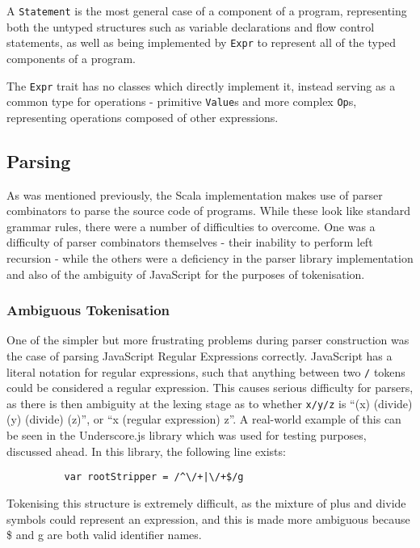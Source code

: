 \documentclass[british, twoside]{bhamthesis}
\theoremstyle{definition}
\begin{document}
      A \texttt{Statement} is the most general case of a component of a program, representing both the untyped structures such as variable declarations and flow control statements, as well as being implemented by \texttt{Expr} to represent all of the typed components of a program.

      The \texttt{Expr} trait has no classes which directly implement it, instead serving as a common type for operations - primitive \texttt{Value}s and more complex \texttt{Op}s, representing operations composed of other expressions.

    \subsection{Parsing}
      As was mentioned previously, the Scala implementation makes use of parser combinators to parse the source code of programs. While these look like standard grammar rules, there were a number of difficulties to overcome. One was a difficulty of parser combinators themselves - their inability to perform left recursion - while the others were a deficiency in the parser library implementation and also of the ambiguity of JavaScript for the purposes of tokenisation.

      \subsubsection{Ambiguous Tokenisation}
        One of the simpler but more frustrating problems during parser construction was the case of parsing JavaScript Regular Expressions correctly. JavaScript has a literal notation for regular expressions, such that anything between two \texttt{/} tokens could be considered a regular expression. This causes serious difficulty for parsers, as there is then ambiguity at the lexing stage as to whether \texttt{x/y/z} is ``(x) (divide) (y) (divide) (z)'', or ``x (regular expression) z''. A real-world example of this can be seen in the Underscore.js library which was used for testing purposes, discussed ahead. In this library, the following line exists:

        \begin{lstlisting}
          var rootStripper = /^\/+|\/+$/g
        \end{lstlisting}

        Tokenising this structure is extremely difficult, as the mixture of plus and divide symbols could represent an expression, and this is made more ambiguous because \$ and g are both valid identifier names.
\end{document}
